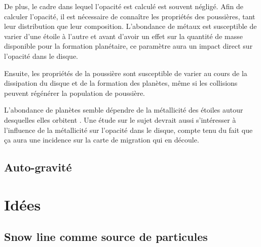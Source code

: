 De plus, le cadre dans lequel l'opacité est calculé est souvent négligé. Afin de calculer l'opacité, il est nécessaire de connaître les propriétés des poussières, tant leur distribution que leur composition. L'abondance de métaux est susceptible de varier d'une étoile à l'autre et avant d'avoir un effet sur la quantité de masse disponible pour la formation planétaire, ce paramètre aura un impact direct sur l'opacité dans le disque. 

Ensuite, les propriétés de la poussière sont susceptible de varier au cours de la dissipation du disque et de la formation des planètes, même si les collisions peuvent régénérer la population de poussière.

L'abondance de planètes semble dépendre de la métallicité des étoiles autour desquelles elles orbitent \citep{fischer2005planet}. Une étude sur le sujet devrait aussi s'intéresser à l'influence de la métallicité sur l'opacité dans le disque, compte tenu du fait que ça aura une incidence sur la carte de migration qui en découle.

\subsection{Auto-gravité}

\section{Idées}
\subsection{Snow line comme source de particules}
